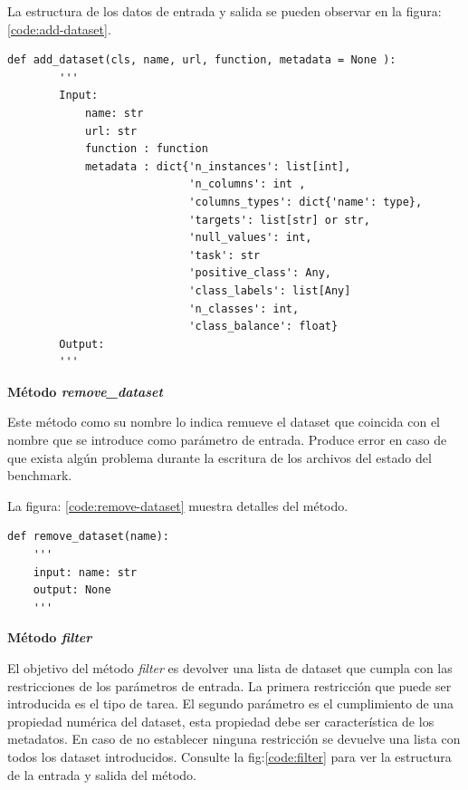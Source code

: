 La estructura de los datos de entrada y salida se pueden observar en la figura:\ref{code:add-dataset}. 

\begin{lstlisting}[caption= Método add\_dataset, label= code:add-dataset]
    def add_dataset(cls, name, url, function, metadata = None ):
        '''
        Input:
            name: str
            url: str
            function : function
            metadata : dict{'n_instances': list[int],
                            'n_columns': int , 
                            'columns_types': dict{'name': type},
                            'targets': list[str] or str,
                            'null_values': int,
                            'task': str 
                            'positive_class': Any,
                            'class_labels': list[Any] 
                            'n_classes': int, 
                            'class_balance': float}
        Output: 
        ''' 
\end{lstlisting}

\begin{flushleft} 
    { \textbf{Método \textit{remove\_dataset} }}\label{method:remove}
\end{flushleft}
Este método como su nombre lo indica remueve el dataset que coincida con el nombre que se introduce como parámetro de entrada. 
Produce error en caso de que exista algún problema durante la escritura de los archivos del estado del benchmark.

La figura: \ref{code:remove-dataset} muestra detalles del método.

\begin{lstlisting}[caption= Método remove\_dataset, label= code:remove-dataset]
def remove_dataset(name):
    '''
    input: name: str
    output: None
    '''
\end{lstlisting}

\begin{flushleft} 
    { \textbf{Método \textit{filter}}}\label{method:filter}
\end{flushleft}
El objetivo del método \textit{filter} es devolver una lista de dataset que cumpla con las restricciones de los parámetros de entrada. La primera 
restricción que puede ser introducida es el tipo de tarea. El segundo parámetro es el cumplimiento de una propiedad numérica del 
dataset, esta propiedad debe ser característica de los metadatos. 
En caso de no establecer ninguna restricción se devuelve una lista con todos los dataset introducidos.
Consulte la fig:\ref{code:filter} para ver la estructura de la entrada y salida del método.

